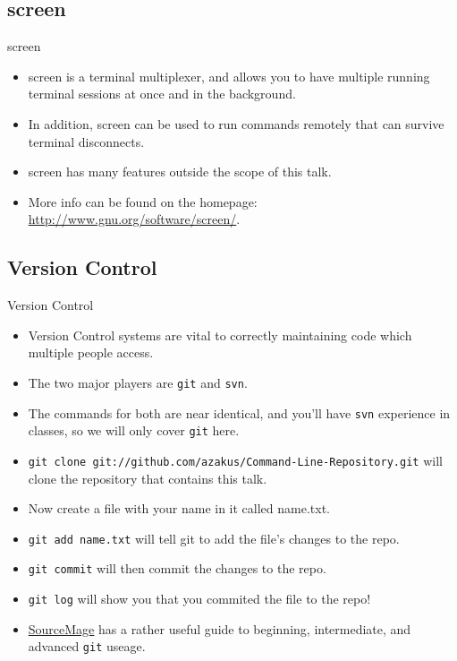 \documentclass[10pt]{beamer}
\begin{document}
\subsection{screen}
\begin{frame}{screen}
\begin{itemize}[<+->]
\item screen is a terminal multiplexer, and allows you to have multiple running terminal sessions at once and in the background.
\item In addition, screen can be used to run commands remotely that can survive terminal disconnects.
\item screen has many features outside the scope of this talk.
\item More info can be found on the homepage: \url{http://www.gnu.org/software/screen/}.
\end{itemize}
\end{frame}

\subsection{Version Control}
\begin{frame}{Version Control}
\begin{itemize}[<+->]
\item Version Control systems are vital to correctly maintaining code which multiple people access.
\item The two major players are \texttt{\color{blue}git} and \texttt{\color{blue}svn}.
\item The commands for both are near identical, and you'll have \texttt{\color{blue}svn} experience in classes, so we will only cover \texttt{\color{blue}git} here.
\item \texttt{\color{blue}git clone git://github.com/azakus/Command-Line-Repository.git} will clone the repository that contains this talk.
\item Now create a file with your name in it called name.txt.
\item \texttt{\color{blue}git add name.txt} will tell git to add the file's changes to the repo.
\item \texttt{\color{blue}git commit} will then commit the changes to the repo.
\item \texttt{\color{blue}git log} will show you that you commited the file to the repo!
\item \href{http://www.sourcemage.org/Git\_Guide}{\color{blue}SourceMage} has a rather useful guide to beginning, intermediate, and advanced \texttt{git} useage.
\end{itemize}
\end{frame}
\end{document}
